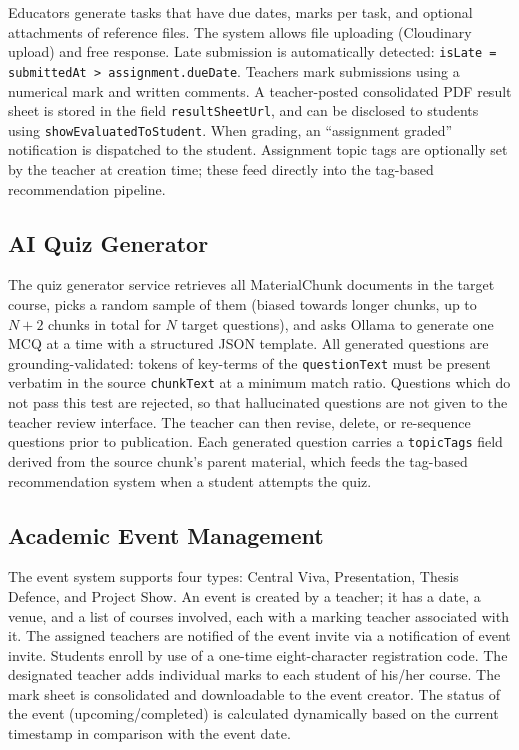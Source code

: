 \documentclass[12pt,a4paper]{report}
\begin{document}
Educators generate tasks that have due dates, marks per task, and optional attachments of reference files. The system allows file uploading (Cloudinary upload) and free response. Late submission is automatically detected: \texttt{isLate = submittedAt > assignment.dueDate}. Teachers mark submissions using a numerical mark and written comments. A teacher-posted consolidated PDF result sheet is stored in the field \texttt{resultSheetUrl}, and can be disclosed to students using \texttt{showEvaluatedToStudent}. When grading, an ``assignment graded'' notification is dispatched to the student. Assignment topic tags are optionally set by the teacher at creation time; these feed directly into the tag-based recommendation pipeline.

\subsection{AI Quiz Generator}

The quiz generator service retrieves all MaterialChunk documents in the target course, picks a random sample of them (biased towards longer chunks, up to $N+2$ chunks in total for $N$ target questions), and asks Ollama to generate one MCQ at a time with a structured JSON template. All generated questions are grounding-validated: tokens of key-terms of the \texttt{questionText} must be present verbatim in the source \texttt{chunkText} at a minimum match ratio. Questions which do not pass this test are rejected, so that hallucinated questions are not given to the teacher review interface. The teacher can then revise, delete, or re-sequence questions prior to publication. Each generated question carries a \texttt{topicTags} field derived from the source chunk's parent material, which feeds the tag-based recommendation system when a student attempts the quiz.

\subsection{Academic Event Management}

The event system supports four types: Central Viva, Presentation, Thesis Defence, and Project Show. An event is created by a teacher; it has a date, a venue, and a list of courses involved, each with a marking teacher associated with it. The assigned teachers are notified of the event invite via a notification of event invite. Students enroll by use of a one-time eight-character registration code. The designated teacher adds individual marks to each student of his/her course. The mark sheet is consolidated and downloadable to the event creator. The status of the event (upcoming/completed) is calculated dynamically based on the current timestamp in comparison with the event date.
\end{document}
